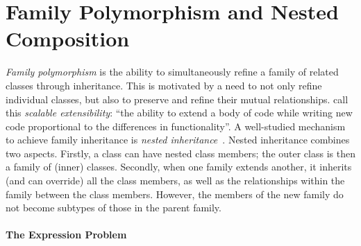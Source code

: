 \section{Family Polymorphism and Nested Composition}
\label{sec:ernst}

\emph{Family polymorphism} is the ability to simultaneously refine a family of
related classes through inheritance. This is motivated by a need to not only
refine individual classes, but also to preserve and refine their mutual
relationships. \citet{Nystrom_2004} call this \emph{scalable extensibility}:
``the ability to extend a body of code while writing new code proportional to
the differences in functionality''.
%
A well-studied mechanism to achieve family inheritance is \emph{nested
inheritance}~\citep{Nystrom_2004}. Nested inheritance combines two aspects.
Firstly, a class can have nested class members; the outer class is then a
family of (inner) classes. Secondly, when one family extends another, it
inherits (and can override) all the class members, as well as the relationships
within the family between the class members. However,
the members of the new family do not become subtypes of those in the parent family.

\paragraph{The Expression Problem}


